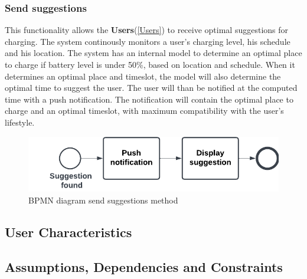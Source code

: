 \subsubsection{Send suggestions}
This functionality allows the \textbf{Users}(\ref{Users}) to receive optimal suggestions for charging.
The system continously monitors a user's charging level, his schedule and his location.
The system has an internal model to determine an optimal place to charge if battery level is under 50\%, based on location and schedule.
When it determines an optimal place and timeslot, the model will also determine the optimal time to suggest the user.
The user will than be notified at the computed time with a push notification. The notification will contain the optimal place to charge and an optimal timeslot, with maximum compatibility with the user's lifestyle. 
\begin{figure}[H]
    \begin{center}
        \includegraphics[width=\textwidth]{img/fun-sug.png}
        \caption{BPMN diagram send suggestions method}
    \end{center}
\end{figure}
%
\subsection{User Characteristics}
\subsection{Assumptions, Dependencies and Constraints}